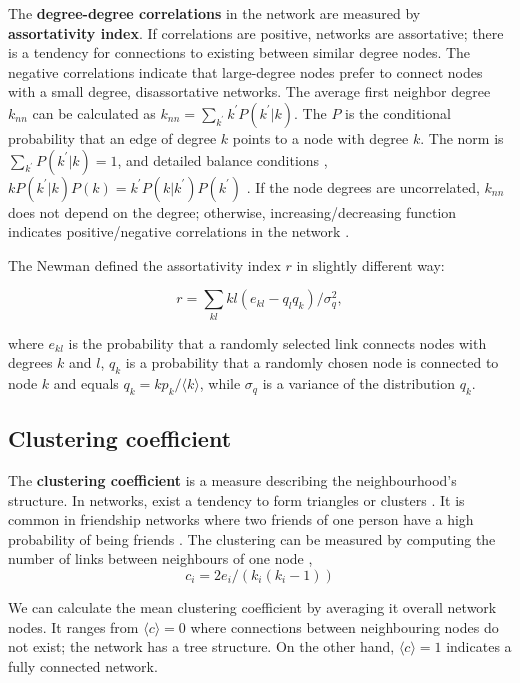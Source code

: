 The \textbf{degree-degree correlations} in the network are measured by \textbf{assortativity index}. %
If correlations are positive, networks are assortative; there is a tendency for connections to existing between similar degree nodes. The negative correlations indicate that large-degree nodes prefer to connect nodes with a small degree, disassortative networks. The average first neighbor degree $k_{nn}$ can be calculated as $k_{nn} = \sum_{k^{'}}k^{'}P(k^{'}|{k})$. The $P$ is the conditional probability that an edge of degree $k$ points to a node with degree $k$. The norm is $\sum_{k^{'}}P(k^{'}|k)=1$, and detailed balance conditions \cite{boccaletti2006complex},  $kP(k^{'}|k)P(k) = k^{'}P(k|k^{'})P(k^{'})$ \cite{boccaletti2006complex}. If the node degrees are uncorrelated, $k_{nn}$ does not depend on the degree; otherwise, increasing/decreasing function indicates positive/negative correlations in the network \cite{park2003}.

The Newman defined the assortativity \cite{newman2002assortative} index $r$ in slightly different way:

\begin{equation}
r = \sum_{kl}kl(e_{kl} - q_lq_k) / \sigma_q^2 ,
\end{equation}

where $e_{kl}$ is the probability that a randomly selected link connects nodes with degrees $k$ and $l$, $q_k$ is a probability that a randomly chosen node is connected to node $k$ and equals $q_k = kp_k / \langle k \rangle$, while $\sigma_q$ is a variance of the distribution $q_k$. 

\subsection{Clustering coefficient}

The \textbf{clustering coefficient} is a measure describing the neighbourhood's structure. In networks, exist a tendency to form triangles or clusters \cite{barabasi2016network}. It is common in friendship networks where two friends of one person have a high probability of being friends \cite{mata2020complex}. %
The clustering can be measured by computing the number of links between neighbours of one node \cite{watts1998collective},
\begin{equation}
c_i=2e_i/(k_i(k_i-1))
\end{equation}

We can calculate the mean clustering coefficient by averaging it overall network nodes. It ranges from  $\langle c \rangle = 0$ where connections between neighbouring nodes do not exist; the network has a tree structure. On the other hand, $\langle c \rangle = 1$ indicates a fully connected network. 

